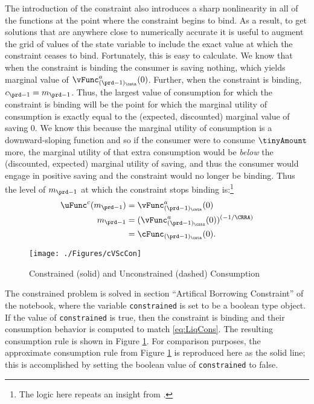 \documentclass[\econtexRoot/SolvingMicroDSOPs]{subfiles}
\begin{document}
The introduction of the constraint also introduces a sharp
nonlinearity in all of the functions at the point where the constraint
begins to bind.  As a result, to get solutions that are anywhere close
to numerically accurate it is useful to augment the grid of values of
the state variable to include the exact value at which the constraint
ceases to bind.  Fortunately, this is easy to calculate.  We know that
when the constraint is binding the consumer is saving nothing, which
yields marginal value of $\vFunc^{{a}}_{({\prd-1})_\cntn}(0)$. Further, when the
constraint is binding, ${c}_{\prd-1} = {m}_{\prd-1}$.  Thus, the largest
value of consumption for which the constraint is binding will be the
point for which the marginal utility of consumption is exactly equal
to the (expected, discounted) marginal value of saving 0.  We know
this because the marginal utility of consumption is a downward-sloping
function and so if the consumer were to consume $\tinyAmount$ more,
the marginal utility of that extra consumption would be \textit{below}
the (discounted, expected) marginal utility of saving, and thus the
consumer would engage in positive saving and the constraint would no
longer be binding.  Thus the level of ${m}_{\prd-1}$ at which the
constraint stops binding is:\footnote{The logic here repeats an insight from \cite{deatonLiqConstr}.}
\begin{equation}\begin{gathered}\begin{aligned}
      \uFunc^{{c}}({m}_{\prd-1})  & = \vFunc^{{a}}_{({\prd-1})_\cntn}(0)  \nonumber \\
      {m}_{\prd-1}  & = (\vFunc^{{a}}_{({\prd-1})_\cntn}(0))^{(-1/\CRRA)}  \nonumber
      \\        & = \cFunc_{({\prd-1})_\cntn}(0). \label{eq:LCbindsTm1}
    \end{aligned}\end{gathered}\end{equation}

\hypertarget{cVScCon}{}
\begin{figure}
  \texttt{[image: ./Figures/cVScCon]}
  \caption{Constrained (solid) and Unconstrained (dashed) Consumption}
  \label{fig:cVScCon}
\end{figure}

The constrained problem is solved in section ``Artifical Borrowing Constraint''
of the notebook, where the variable
\texttt{constrained} is set to be a boolean type object. If the value of \texttt{constrained}
is true, then the constraint is binding and their consumption behavior is computed to match
\eqref{eq:LiqCons}. The resulting consumption rule is shown in Figure \ref{fig:cVScCon}. For comparison purposes,
the approximate consumption rule from Figure \ref{fig:cVScCon} is
reproduced here as the solid line; this is accomplished by setting the boolean value
of \texttt{constrained} to false.
\end{document}
